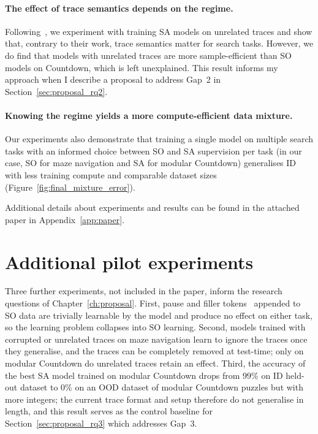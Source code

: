 \paragraph{The effect of trace semantics depends on the regime.}
Following~\citet{valmeekamSemanticsUnreasonableEffectiveness2025}, we experiment with training SA models on unrelated traces and show that, contrary to their work, trace semantics matter for search tasks.
However, we do find that models with unrelated traces are more sample-efficient than SO models on Countdown, which is left unexplained.
This result informs my approach when I describe a proposal to address Gap~2 in Section~\ref{sec:proposal_rq2}.

\paragraph{Knowing the regime yields a more compute-efficient data mixture.}
Our experiments also demonstrate that training a single model on multiple search tasks with an informed choice between SO and SA supervision per task (in our case, SO for maze navigation and SA for modular Countdown) generalises ID with less training compute and comparable dataset sizes (Figure~\ref{fig:final_mixture_error}).

Additional details about experiments and results can be found in the attached paper in Appendix~\ref{app:paper}.

\section{Additional pilot experiments}
\label{sec:progress_pilots}

Three further experiments, not included in the paper, inform the research questions of Chapter~\ref{ch:proposal}.
First, pause and filler tokens~\citep{goyalPauseTokens2024,pfauLetsThinkDot2024} appended to SO data are trivially learnable by the model and produce no effect on either task, so the learning problem collapses into SO learning.
Second, models trained with corrupted or unrelated traces on maze navigation learn to ignore the traces once they generalise, and the traces can be completely removed at test-time; only on modular Countdown do unrelated traces retain an effect.
Third, the accuracy of the best SA model trained on modular Countdown drops from $99\%$ on ID held-out dataset to $0\%$ on an OOD dataset of modular Countdown puzzles but with more integers; the current trace format and setup therefore do not generalise in length, and this result serves as the control baseline for Section~\ref{sec:proposal_rq3} which addresses Gap~3.

